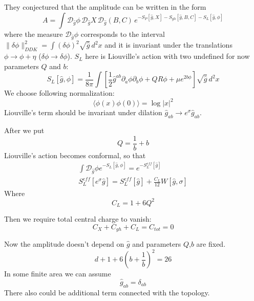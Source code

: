 \documentclass[a4paper,12pt]{article}
\theoremstyle{definition} \newtheorem{Def}{Definition}
\begin{document}
They conjectured that the amplitude can be written in the form
\begin{equation}
  \label{eq:24}
  A=\int \mathcal{D}_{\hat{g}}\phi\, \mathcal{D}_{\hat{g}} X\, \mathcal{D}_{\hat{g}} (B,C)\, e^{-S_P[\hat{g},X]-S_{gh}[\hat{g},B,C]-S_L[\hat{g},\phi]}
\end{equation}
where the measure $\mathcal{D}_{\hat{g}} \phi$ corresponds to the interval $\|\delta\phi\|^2_{DDK} = \int (\delta\phi)^2 \sqrt{\hat{g}}\, d^2x$ and it is invariant under the translations $\phi\to \phi+\eta$ ($\delta\phi\to \delta\phi$). 
$S_L$ here is Liouville's action with two undefined for now parameters $Q$ and $b$:
\begin{equation}
  \label{eq:25}
  S_L[\hat{g},\phi] = \frac{1}{8\pi} \int \left[ \frac{1}{2} \hat{g}^{ab} \partial_a \phi \partial_b \phi + QR\phi +\mu e^{2b\phi}\right] \sqrt{\hat{g}} \, d^2x
\end{equation}
We choose following normalization:
\begin{equation}
  \label{eq:26}
  \langle \phi(x) \phi(0) \rangle = \log |x|^2
\end{equation}
Liouville's term should be invariant under dilation $\hat{g}_{ab}\to e^{\sigma}\hat{g}_{ab}$.

After we put
\begin{equation}
  \label{eq:27}
  Q=\frac{1}{b}+b
\end{equation}
Liouville's action becomes conformal, so that
\begin{equation}
  \label{eq:28}
  \begin{split}
    \int \mathcal{D}_{\hat{g}} \phi e^{-S_L[\hat g,\phi]} = e^{-S_L^{eff}[\hat g]}\\
    S_L^{eff} [e^{\sigma}\hat{g}]=S_L^{eff}[\hat g] +\frac{C_L}{12} W[\hat g,\sigma]
  \end{split}
\end{equation}
Where
\begin{equation}
  \label{eq:29}
  C_L=1+6 Q^2
\end{equation}

Then we require total central charge to vanish:
\begin{equation}
  \label{eq:30}
  C_X+C_{gh}+C_L=C_{tot}=0
\end{equation}

Now the amplitude doesn't depend on $\hat{g}$ and parameters $Q$,$b$ are fixed.
\begin{equation}
  \label{eq:18}
  d+1+6\left(b+\frac{1}{b}\right)^2=26
\end{equation}
In some finite area we can assume
\begin{equation}
  \label{eq:31}
  \hat{g}_{ab}=\delta_{ab}
\end{equation}
There also could be additional term connected with the topology.
\end{document}
